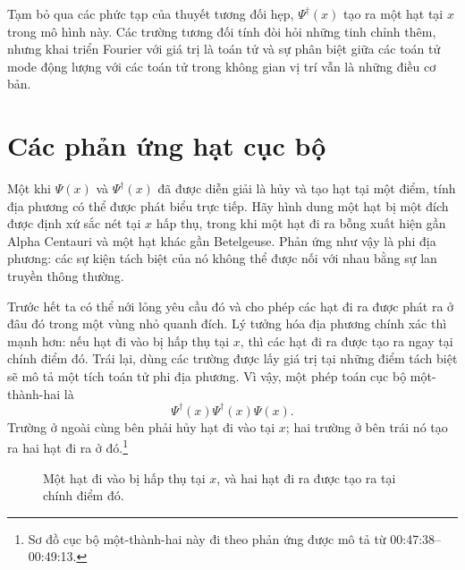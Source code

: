 Tạm bỏ qua các phức tạp của thuyết tương đối hẹp, \(\Psi^\dagger(x)\) tạo ra một hạt tại \(x\) trong mô hình này. Các trường tương đối tính đòi hỏi những tinh chỉnh thêm, nhưng khai triển Fourier với giá trị là toán tử và sự phân biệt giữa các toán tử mode động lượng với các toán tử trong không gian vị trí vẫn là những điều cơ bản.

\begin{classroomqa}
\end{classroomqa}

\section{Các phản ứng hạt cục bộ}

Một khi \(\Psi(x)\) và \(\Psi^\dagger(x)\) đã được diễn giải là hủy và tạo hạt tại một điểm, tính địa phương có thể được phát biểu trực tiếp. Hãy hình dung một hạt bị một đích được định xứ sắc nét tại \(x\) hấp thụ, trong khi một hạt đi ra bỗng xuất hiện gần Alpha Centauri và một hạt khác gần Betelgeuse. Phản ứng như vậy là phi địa phương: các sự kiện tách biệt của nó không thể được nối với nhau bằng sự lan truyền thông thường.

Trước hết ta có thể nới lỏng yêu cầu đó và cho phép các hạt đi ra được phát ra ở đâu đó trong một vùng nhỏ quanh đích. Lý tưởng hóa địa phương chính xác thì mạnh hơn: nếu hạt đi vào bị hấp thụ tại \(x\), thì các hạt đi ra được tạo ra ngay tại chính điểm đó. Trái lại, dùng các trường được lấy giá trị tại những điểm tách biệt sẽ mô tả một tích toán tử phi địa phương. Vì vậy, một phép toán cục bộ một-thành-hai là
\begin{equation}
\Psi^\dagger(x)\Psi^\dagger(x)\Psi(x).
\end{equation}
Trường ở ngoài cùng bên phải hủy hạt đi vào tại \(x\); hai trường ở bên trái nó tạo ra hai hạt đi ra ở đó.\footnote{Sơ đồ cục bộ một-thành-hai này đi theo phản ứng được mô tả từ 00:47:38--00:49:13.}

\begin{figure}[t]
\centering
{}
\caption{Một hạt đi vào bị hấp thụ tại \(x\), và hai hạt đi ra được tạo ra tại chính điểm đó.}
\end{figure}

